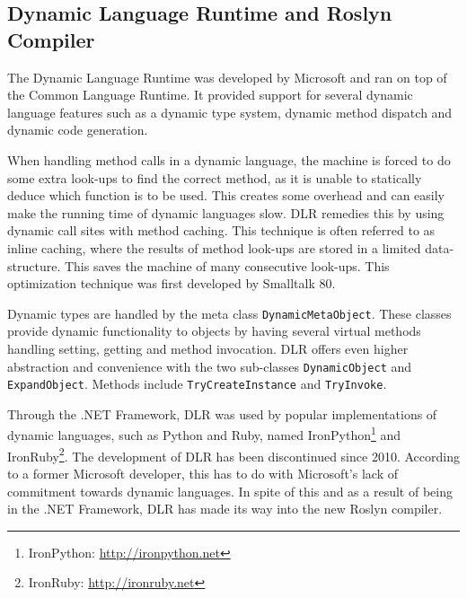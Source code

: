 
\subsection{Dynamic Language Runtime and Roslyn Compiler}

The Dynamic Language Runtime\cite{dlr} was developed by Microsoft and ran on
top of the Common Language Runtime. It provided support for several dynamic
language features such as a dynamic type system, dynamic method dispatch and
dynamic code generation.

When handling method calls in a dynamic language, the machine is forced to do
some extra look-ups to find the correct method, as it is unable to statically
deduce which function is to be used. This creates some overhead and can easily
make the running time of dynamic languages slow. DLR remedies this by using
dynamic call sites with method caching. This technique is often referred to as
inline caching, where the results of method look-ups are stored in a limited
data-structure. This saves the machine of many consecutive look-ups. This
optimization technique was first developed by Smalltalk 80\cite{deutsch}.

Dynamic types are handled by the meta class {\tt DynamicMetaObject}. These
classes provide dynamic functionality to objects by having several virtual
methods handling setting, getting and method invocation. DLR offers even higher
abstraction and convenience with the two sub-classes {\tt DynamicObject} and
{\tt ExpandObject}. Methods include {\tt TryCreateInstance} and {\tt TryInvoke}.

Through the .NET Framework, DLR was used by popular implementations of dynamic
languages, such as Python and Ruby, named
IronPython\footnote{IronPython: \url{http://ironpython.net}} and
IronRuby\footnote{IronRuby: \url{http://ironruby.net}}. The development of DLR has been
discontinued since 2010. According to a former Microsoft developer, this has to
do with Microsoft's lack of commitment towards dynamic
languages\cite{schementi}\cite{cooper}. In spite of this and as a result of
being in the .NET Framework, DLR has made its way into the new Roslyn compiler.

